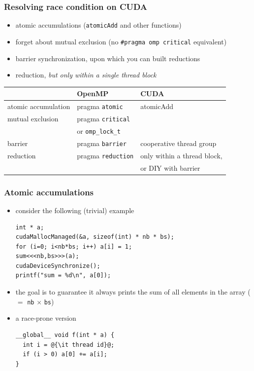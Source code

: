 \documentclass[12pt,dvipdfmx]{beamer}
\newcommand{\mura}[1]{{\color{purple}#1}}
\newcommand{\ao}[1]{{\color{blue}#1}}
\begin{document}
\begin{frame}
\frametitle{Resolving race condition on CUDA}
\begin{itemize}
\item \ao{atomic accumulations} ({\tt atomicAdd} and other functions)
\item forget about mutual exclusion (no {\tt \#pragma omp critical} equivalent)
\item \ao{barrier synchronization},
  upon which you can built reductions
\item \ao{reduction}, \mura{\it but only within a single thread block}
\end{itemize}

\begin{center}
  {\footnotesize
  \begin{tabular}{|l|l|l|}\hline
                    & OpenMP  & CUDA \\\hline
atomic accumulation & pragma {\tt atomic} & atomicAdd \\
mutual exclusion & pragma {\tt critical} &  \\
                 & or {\tt omp\_lock\_t} &  \\
barrier & pragma {\tt barrier} & cooperative thread group \\
reduction & pragma {\tt reduction} & only within a thread block, \\
                    &  & or DIY with barrier \\\hline    
\end{tabular}}
\end{center}

\end{frame}

\begin{frame}[fragile]
  \frametitle{Atomic accumulations}
  \begin{itemize}
  \item consider the following (trivial) example
\begin{lstlisting}
int * a;      
cudaMallocManaged(&a, sizeof(int) * nb * bs);
for (i=0; i<nb*bs; i++) a[i] = 1;
sum<<<nb,bs>>>(a);
cudaDeviceSynchronize();
printf("sum = %d\n", a[0]);
\end{lstlisting}%
\item the goal is to guarantee it always prints the sum of all elements
  in the array ($=$ {\tt nb} $\times$ {\tt bs})
\item a race-prone version
\begin{lstlisting}
__global__ void f(int * a) {
  int i = @{\it thread id}@;
  if (i > 0) a[0] += a[i];
}
\end{lstlisting}  
\end{itemize}
\end{frame}
\end{document}
